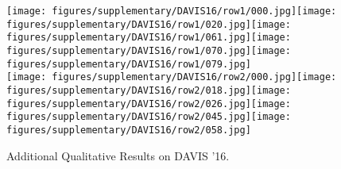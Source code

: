 \documentclass{bmvc2k_arxiv}
\begin{document}
\vspace{-8pt}
\begin{figure}[h]
\centering
\texttt{[image: figures/supplementary/DAVIS16/row1/000.jpg]}\hspace{1px}\texttt{[image: figures/supplementary/DAVIS16/row1/020.jpg]}\hspace{1px}\texttt{[image: figures/supplementary/DAVIS16/row1/061.jpg]}\hspace{1px}\texttt{[image: figures/supplementary/DAVIS16/row1/070.jpg]}\hspace{1px}\texttt{[image: figures/supplementary/DAVIS16/row1/079.jpg]}\\
\texttt{[image: figures/supplementary/DAVIS16/row2/000.jpg]}\hspace{1px}\texttt{[image: figures/supplementary/DAVIS16/row2/018.jpg]}\hspace{1px}\texttt{[image: figures/supplementary/DAVIS16/row2/026.jpg]}\hspace{1px}\texttt{[image: figures/supplementary/DAVIS16/row2/045.jpg]}\hspace{1px}\texttt{[image: figures/supplementary/DAVIS16/row2/058.jpg]}\\
  \caption{Additional Qualitative Results on DAVIS '16.}
 \end{figure}
 \vspace{-12pt}
\end{document}

